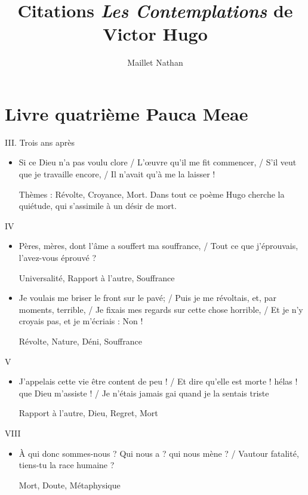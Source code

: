 \documentclass[french,a4paper,11pt,answers]{exam}
\title{Citations \emph{Les Contemplations} de Victor Hugo}
\author{Maillet Nathan}
\date{}
\newcommand{\cit}[2]{\og #1 \fg{} \begin{solution}{ #2 }\end{solution}} %
\begin{document}
	\maketitle
	\section{Livre quatrième \og Pauca Meae \fg}
	\begin{cadre}{III. Trois ans après}
		\begin{itemize}
			\item \cit{Si ce Dieu n'a pas voulu clore / L'\oe{}uvre qu'il me fit commencer, / S'il veut que je travaille encore, / Il n'avait qu'à me la laisser !} %
				{Thèmes : Révolte, Croyance, Mort. Dans tout ce poème Hugo cherche la quiétude, qui s'assimile à un désir de mort.} %
		\end{itemize}
	\end{cadre}
	
	\begin{cadre}{IV}
		\begin{itemize}
			\item \cit{Pères, mères, dont l'âme a souffert ma souffrance, / Tout ce que j'éprouvais, l'avez-vous éprouvé ?\vspace{-5mm}}
				{Universalité, Rapport à l'autre, Souffrance}
			\item \cit{Je voulais me briser le front sur le pavé; / Puis je me révoltais, et, par moments, terrible, / Je fixais mes regards sur cette chose horrible, / Et je n'y croyais pas, et je m'écriais : Non !}
				{Révolte, Nature, Déni, Souffrance}
		\end{itemize}
	\end{cadre}
		
	\begin{cadre}{V}
		\begin{itemize}
			\item \cit{J'appelais cette vie être content de peu ! / Et dire qu'elle est morte ! hélas ! que Dieu m'assiste ! / Je n'étais jamais gai quand je la sentais triste}
				{Rapport à l'autre, Dieu, Regret, Mort}
		\end{itemize}
	\end{cadre}
	
	\begin{cadre}{VIII}
		\begin{itemize}
			\item \cit{À qui donc sommes-nous ? Qui nous a ? qui nous mène ? / Vautour fatalité, tiens-tu la race humaine ?}
				{Mort, Doute, Métaphysique}
		\end{itemize}
	\end{cadre}
\end{document}
